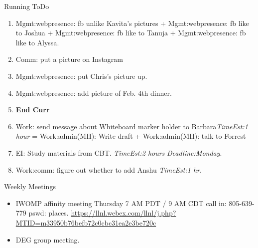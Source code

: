 \documentclass[serif, mathserif, final]{beamer}
\newcommand{\te}[1]{\textit{TimeEst:}\textit{#1}}
\newcommand{\dl}[1]{\textit{Deadline:}\textit{#1}}
\newcommand{\comments}[1]{}
\begin{document}
\begin{frame}
\begin{columns}
\begin{column}{0.5\linewidth}
\begin{block}{Running ToDo}
\begin{enumerate}
  \item \tiny Mgmt:webpresence: fb unlike Kavita’s pictures +
    Mgmt:webpresence: fb like to Joshua + Mgmt:webpresence: fb like to
    Tanuja + Mgmt:webpresence: fb like to Alyssa. 

  \item \tiny Comm: put a picture on Instagram 
  \item \tiny Mgmt:webpresence: put Chris's picture up. 
    
  \item \tiny Mgmt:webpresence: add picture of Feb. 4th dinner.  
    
  \item \tiny  \textbf{End Curr} 
  \item \tiny Work: send message about Whiteboard marker holder to
    Barbara\te{1 hour} = Work:admin(MH): Write draft + Work:admin(MH): talk to Forrest 
    
  \item \tiny EI: Study materials from CBT.  \te{2 hours} \dl{Monday}.
  \item \tiny Work:comm: figure out whether to add Anshu \te{1 hr}. 
    
    \end{enumerate}
  \end{block}
  
  \begin{block}{Weekly Meetings}
    \begin{itemize}
      \tiny \item \tiny IWOMP affinity meeting Thursday 7 AM PDT / 9 AM
      CDT call in: 805-639-779 pswd: places. \url{https://llnl.webex.com/llnl/j.php?MTID=m33950b76befb72c0cbc31ea2e3be720c}
    \item \tiny DEG group meeting.  
    \end{itemize}
  \end{block} 

\comments{

  \begin{block}{Week Daily Schedule} %
    {\bf Sun:}  Comm: prep for talk, Comm: message to Asavi,
    \newline {\bf Mon:} 
    \newline {\bf Tues:} 
   

\end{block}}
\end{column}
\end{columns}
\end{frame}
\end{document}
